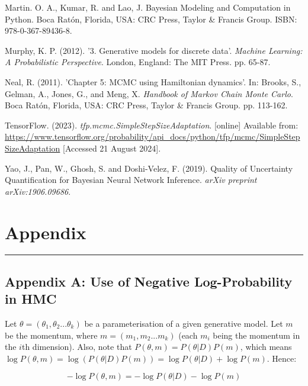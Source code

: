 \documentclass[conference]{IEEEtran}
\begin{document}
\begin{thebibliography}{00}
 Martin. O. A., Kumar, R. and Lao, J. Bayesian Modeling and Computation in Python. Boca Ratón, Florida, USA: CRC Press, Taylor \& Francis Group. ISBN: 978-0-367-89436-8.

 Murphy, K. P. (2012). '3. Generative models for discrete data'. \textit{Machine Learning: A Probabilistic Perspective}. London, England: The MIT Press. pp. 65-87.

 Neal, R. (2011). 'Chapter 5: MCMC using Hamiltonian dynamics'. In: Brooks, S., Gelman, A., Jones, G., and Meng, X. \textit{Handbook of Markov Chain Monte Carlo}. Boca Ratón, Florida, USA: CRC Press, Taylor \& Francis Group. pp. 113-162.

 TensorFlow. (2023). \textit{tfp.mcmc.SimpleStepSizeAdaptation}. [online] Available from: \url{https://www.tensorflow.org/probability/api_docs/python/tfp/mcmc/SimpleStepSizeAdaptation} [Accessed 21 August 2024].

 Yao, J., Pan, W., Ghosh, S. and Doshi-Velez, F. (2019). Quality of Uncertainty Quantification for Bayesian Neural Network Inference. \textit{arXiv preprint arXiv:1906.09686}.

\end{thebibliography}
\vspace{12pt}

\clearpage %

\section*{Appendix}

\par\noindent\rule{0.49\textwidth}{0.1pt}

\subsection*{Appendix A: Use of Negative Log-Probability in HMC}
Let $\theta = (\theta_1, \theta_2 ... \theta_k)$ be a parameterisation of a given generative model. Let $m$ be the momentum, where $m = (m_1, m_2 ... m_k)$ (each $m_i$ being the momentum in the $i$th dimension). Also, note that $P(\theta, m) = P(\theta|D)P(m)$, which means $\log P(\theta, m) = \log (P(\theta|D) P(m)) = \log P(\theta|D) + \log P(m)$. Hence:

\begin{equation*}
	- \log P(\theta, m) = - \log P(\theta|D) - \log P(m)
\end{equation*}
\end{document}
